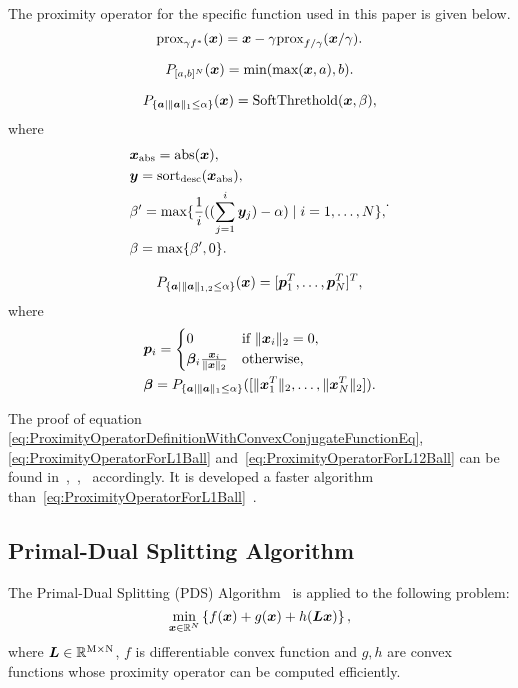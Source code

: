 The proximity operator for the specific function used in this paper is given below.
\begin{equation} \label{eq:ProximityOperatorDefinitionWithConvexConjugateFunctionEq} \proximityOperatorDefinitionWithConvexConjugateFunction. \end{equation}

\begin{equation} \label{eq:ProximityOperatorForBoxConstraint} \projBoxSolution. \end{equation}

\begin{equation} \label{eq:ProximityOperatorForL1Ball}  \projLOneBallSolution, \end{equation}
where
\begin{equation} \label{eq:ProximityOperatorForL1BallWhere} \projLOneBallSolutionWhere. \notag \end{equation}

\begin{equation} \label{eq:ProximityOperatorForL12Ball} \projLOneTwoBallSolution, \end{equation}
where
\begin{equation} \label{eq:ProximityOperatorForL12BallWhere} \projLOneTwoBallSolutionWhere \notag \end{equation}

The proof of equation \eqref{eq:ProximityOperatorDefinitionWithConvexConjugateFunctionEq}, \eqref{eq:ProximityOperatorForL1Ball} and~\eqref{eq:ProximityOperatorForL12Ball} can be found in~\cite[Theorem 3.1 (ii)]{prox-convex-conjugate-function},~\cite{L1-ball-projection},~\cite{L12-ball-projection} accordingly.
It is developed a faster algorithm than~\eqref{eq:ProximityOperatorForL1Ball}~\cite{fast-L1-ball-projection}.

\subsection{Primal-Dual Splitting Algorithm}\label{subsec:primal-dual-splitting-algorithm}
The Primal-Dual Splitting (PDS) Algorithm~\cite{PDS0,PDS1,PDS2,PDS3} is applied to the following problem:
\begin{equation} \label{eq:PDSPrimalEq} \PDSPrimal, \end{equation}
where $\bm{L} \in \realNumber^{\intM \times \intN}$, $f$ is differentiable convex function and $g,h$ are convex functions whose proximity operator can be computed efficiently.

